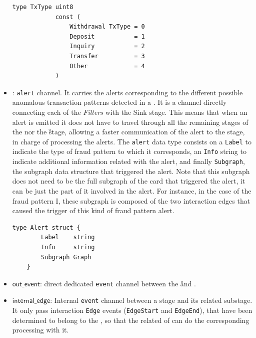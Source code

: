 \begin{itemize}
    \begin{center}
    \lstset{style=golangStyle}
    \begin{lstlisting}[caption={\texttt{TxType} Data Type, for the different interaction types}]
            type TxType uint8
            const (
            	Withdrawal TxType = 0
            	Deposit           = 1
            	Inquiry           = 2
            	Transfer          = 3
            	Other             = 4
            )
    \end{lstlisting}
    \end{center}
    
    \item \alertch: \texttt{alert} channel. It carries the alerts corresponding to the different possible anomalous transaction patterns detected in a \filter. It is a channel directly connecting each of the \emph{Filters} with the Sink stage. This means that when an alert is emitted it does not have to travel through all the remaining \F stages of the \DP nor the \G stage, allowing a faster communication of the alert to the \Sk stage, in charge of processing the alerts. The \texttt{alert} data type consists on a \texttt{Label} to indicate the type of fraud pattern to which it corresponds, an \texttt{Info} string to indicate additional information related with the alert, and finally \texttt{Subgraph}, the subgraph data structure that triggered the alert. Note that this subgraph does not need to be the full subgraph of the card that triggered the alert, it can be just the part of it involved in the alert. For instance, in the case of the fraud pattern I, these subgraph is composed of the two interaction edges that caused the trigger of this kind of fraud pattern alert.
    \begin{center}
    \lstset{style=golangStyle}
    \begin{lstlisting}[caption={\texttt{Alert} Data Type}]
    type Alert struct {
    	Label    string        
    	Info     string        
    	Subgraph Graph         
    }
    \end{lstlisting}
    \end{center}
    \item $\mathsf{out\_event}$: direct dedicated \texttt{event} channel between the \G and \Sk. 
    \item $\mathsf{internal\_edge}$: Internal \texttt{event} channel between a \F stage and its related \FW substage. It only pass interaction \texttt{Edge} events (\texttt{EdgeStart} and \texttt{EdgeEnd}), that have been determined to belong to the \filter, so that the related \FW of \F can do the corresponding processing with it.
  \end{itemize}


